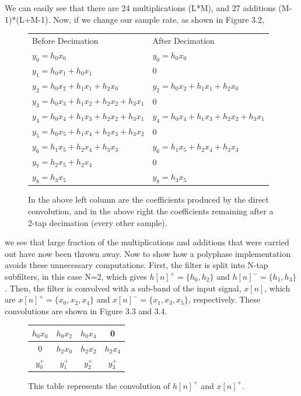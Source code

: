 \documentclass{report}
\begin{document}
We can easily see that there are 24 multiplications (L*M), and 27 additions (M-1)*(L+M-1).  Now, if we change our sample rate, as shown in Figure 3.2, 

\begin{figure}[!ht]
\begin{center}
  \begin{tabular}{ l|l }
    \hline
    Before Decimation & After Decimation\\ \Xhline{1pt}
	$y_0 = h_0 x_0$ & $y_0 = h_0 x_0$\\ \hline
	$y_1 = h_0 x_1 + h_0 x_1$ & 0\\ \hline 
	$y_2 = h_0 x_2 + h_1 x_1 + h_2 x_0$ & $y_2 = h_0 x_2 + h_1 x_1 + h_2 x_0$\\ \hline 
	$y_3 = h_0 x_3 + h_1 x_2+ h_2 x_2 + h_3 x_1$ & 0 \\ \hline 
	$y_4 = h_0 x_4 + h_1 x_3+ h_2 x_2 + h_3 x_1$ & $y_4 = h_0 x_4 + h_1 x_3+ h_2 x_2 +     	h_3 x_1$\\ \hline
	$y_5 = h_0 x_5 + h_1 x_4 + h_2 x_3 + h_3 x_2$ & 0\\ \hline
	$y_6 = h_1 x_5 + h_2 x_4 + h_3 x_3$ & $y_6 = h_1 x_5 + h_2 x_4 + h_3 x_3$\\ \hline
	$y_7 = h_2 x_5 + h_2 x_4$ & 0\\ \hline
	$y_8 = h_3 x_5$ & $y_8 = h_3 x_5$\\ \hline
  \end{tabular}
\end{center}
\caption{In the above left column are the coefficients produced by the direct convolution, and in the above right the coefficients remaining after a 2-tap decimation (every other sample).}
\end{figure}

we see that large fraction of the multiplications and additions that were carried out have now been thrown away.  Now to show how a polyphase implementation avoids these unnecessary computations.  First, the filter is split into N-tap subfilters, in this case N=2, which gives $h[n]^+ = \{h_0, h_2\}$ and $h[n]^- = \{h_1, h_3\}$.  Then, the filter is convolved with a sub-band of the input signal, $x[n]$, which are $x[n]^+ = \{x_0, x_2, x_4\}$ and $x[n]^- = \{x_1, x_3, x_5\}$, respectively.  These convolutions are shown in Figure 3.3 and 3.4.

\smallskip
\begin{figure}[!ht]
\begin{center}
  \begin{tabular}{ c|c|c|c }
	\hline
	$h_0 x_0$ & $h_0 x_2$ &$h_0 x_4$&0\\ \hline
	0 & $h_2 x_0$ & $h_2 x_2$ &$h_2 x_4$\\ \Xhline{1pt}
	$y^+_0$ & $y^+_1$ & $y^+_2$ & $y^+_3$\\ \hline
  \end{tabular}
\end{center}
\caption{This table represents the convolution of $h[n]^+$ and $x[n]^+$.}
\end{figure}
\end{document}
